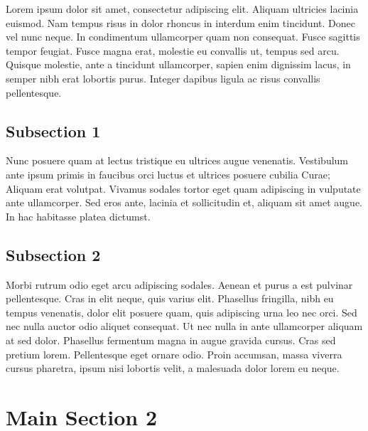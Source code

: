 Lorem ipsum dolor sit amet, consectetur adipiscing elit. Aliquam ultricies lacinia euismod. Nam tempus risus in dolor rhoncus in interdum enim tincidunt. Donec vel nunc neque. In condimentum ullamcorper quam non consequat. Fusce sagittis tempor feugiat. Fusce magna erat, molestie eu convallis ut, tempus sed arcu. Quisque molestie, ante a tincidunt ullamcorper, sapien enim dignissim lacus, in semper nibh erat lobortis purus. Integer dapibus ligula ac risus convallis pellentesque.

\subsection{Subsection 1}

Nunc posuere quam at lectus tristique eu ultrices augue venenatis. Vestibulum ante ipsum primis in faucibus orci luctus et ultrices posuere cubilia Curae; Aliquam erat volutpat. Vivamus sodales tortor eget quam adipiscing in vulputate ante ullamcorper. Sed eros ante, lacinia et sollicitudin et, aliquam sit amet augue. In hac habitasse platea dictumst.


\subsection{Subsection 2}
Morbi rutrum odio eget arcu adipiscing sodales. Aenean et purus a est pulvinar pellentesque. Cras in elit neque, quis varius elit. Phasellus fringilla, nibh eu tempus venenatis, dolor elit posuere quam, quis adipiscing urna leo nec orci. Sed nec nulla auctor odio aliquet consequat. Ut nec nulla in ante ullamcorper aliquam at sed dolor. Phasellus fermentum magna in augue gravida cursus. Cras sed pretium lorem. Pellentesque eget ornare odio. Proin accumsan, massa viverra cursus pharetra, ipsum nisi lobortis velit, a malesuada dolor lorem eu neque.


\section{Main Section 2}

